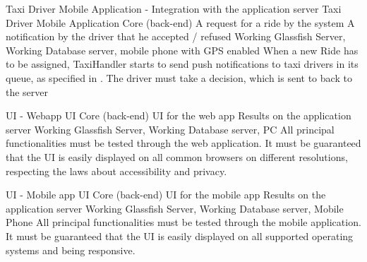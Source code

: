 \testx
{Taxi Driver Mobile Application - Integration with the application server}
{Taxi Driver Mobile Application}
{Core (back-end)}
{A request for a ride by the system}
{A notification by the driver that he accepted / refused}
{Working Glassfish Server, Working Database server, mobile phone with GPS enabled}
{When a new Ride has to be assigned, TaxiHandler starts to send push notifications to taxi drivers in its queue, as specified in \cite[p.~22]{bib:dd}. The driver must take a decision, which is sent to back to the server}

\testx
{UI - Webapp}
{UI}
{Core (back-end)}
{UI for the web app}
{Results on the application server}
{Working Glassfish Server, Working Database server, PC}
{All principal functionalities must be tested through the web application. It must be guaranteed that the UI is easily displayed on all common browsers on different resolutions, respecting the laws about accessibility and privacy.}

\testx
{UI - Mobile app}
{UI}
{Core (back-end)}
{UI for the mobile app}
{Results on the application server}
{Working Glassfish Server, Working Database server, Mobile Phone}
{All principal functionalities must be tested through the mobile application. It must be guaranteed that the UI is easily displayed on all supported operating systems and being responsive.}